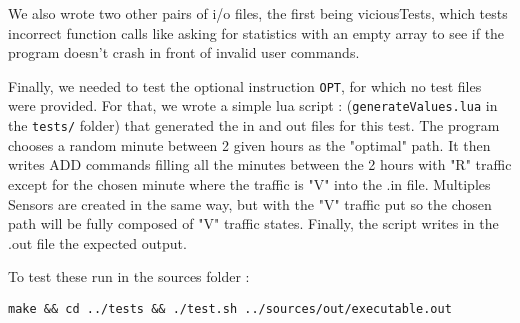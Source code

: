 \documentclass[10pt]{article}
\begin{document}
We also wrote two other pairs of i/o files, the first being viciousTests, which tests incorrect function calls like asking for statistics with an empty array to see if the program doesn't crash in front of invalid user commands.

Finally, we needed to test the optional instruction \texttt{OPT}, for which no test files were provided. For that, we wrote a simple lua script : (\texttt{generateValues.lua} in the \texttt{tests/} folder) that generated the in and out files for this test. The program chooses a random minute between 2 given hours as the "optimal" path. It then writes ADD commands filling all the minutes between the 2 hours with "R" traffic except for the chosen minute where the traffic is "V" into the .in file. Multiples Sensors are created in the same way, but with the "V" traffic put so the chosen path will be fully composed of "V" traffic states. Finally, the script writes in the .out file the expected output.

To test these run in the sources folder :

\texttt{make \&\& cd ../tests \&\& ./test.sh ../sources/out/executable.out}
\end{document}
